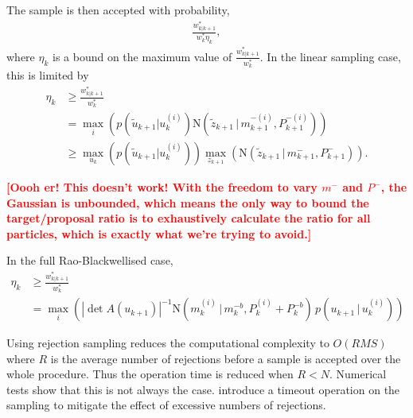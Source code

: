 \documentclass[twocolumn]{autart}    %
\newcommand{\comment}[1]{\textcolor{red}{\textbf{[#1]}}}
\begin{document}
The sample is then accepted with probability,
%
\begin{equation}
\begin{split}
  \frac{ w_{k|k+1}^* }{ w_k^* \eta_k }     ,
\end{split}
\end{equation}
%
where $\eta_k$ is a bound on the maximum value of $\frac{ w_{k|k+1}^* }{ w_k^* }$. In the linear sampling case, this is limited by
%
\begin{equation}
\begin{split}
  \eta_k &\ge \frac{ w_{k|k+1}^* }{ w_k^* } \\
  & = \max_i( p(\tilde{u}_{k+1} | u_k^{(i)}) \mathrm{N}(\tilde{z}_{k+1}\,|\, m^{-(i)}_{k+1}, P^{-(i)}_{k+1}) ) \\
  & \ge \max_{u_k}( p(\tilde{u}_{k+1} | u_k^{(i)}) ) \max_{z_{k+1}}( \mathrm{N}(\tilde{z}_{k+1}\,|\, m^{-}_{k+1}, P^{-}_{k+1}) )   .
\end{split}
\end{equation}

\comment{Oooh er! This doesn't work! With the freedom to vary $m^-$ and $P^-$, the Gaussian is unbounded, which means the only way to bound the target/proposal ratio is to exhaustively calculate the ratio for all particles, which is exactly what we're trying to avoid.}

In the full Rao-Blackwellised case,
%
\begin{equation}
\begin{split}
  \eta_k &\ge \frac{ w_{k|k+1}^* }{ w_k^* } \\
  & = \max_i( |\det A(u_{k+1})|^{-1} \mathrm{N}(m_k^{(i)}\,|\,m^{-b}_{k},P_k^{(i)}+P^{-b}_{k}) \, p(u_{k+1}\,|\,u_{k}^{(i)}) ) 
\end{split}
\end{equation}


Using rejection sampling reduces the computational complexity to $O(RMS)$ where $R$ is the average number of rejections before a sample is accepted over the whole procedure. Thus the operation time is reduced when $R < N$. Numerical tests show that this is not always the case. \cite{Lindsten+Schon:2011} introduce a timeout operation on the sampling to mitigate the effect of excessive numbers of rejections.
\end{document}
